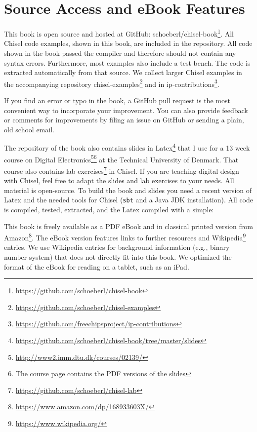 \documentclass[%
    10pt,
    headinclude, footexclude,
    openright, %
    notitlepage,
    cleardoubleempty,
    headsepline,
    pointlessnumbers,
    bibtotoc, idxtotoc,
    ]{scrbook}
\newcommand{\code}[1]{{\lstinline[basicstyle=\small\ttfamily]{#1}}}
\newcommand{\myref}[2]{\href{#1}{#2}}
\renewcommand{\myref}[2]{{#2}{\footnote{\url{#1}}}}
\begin{document}
\section{Source Access and eBook Features}

This book is open source and hosted at GitHub: \myref{https://github.com/schoeberl/chisel-book}{schoeberl/chisel-book}.
All Chisel code examples, shown in this book, are included in the repository.
All code shown in the book passed the compiler and therefore should not contain any syntax errors.
Furthermore, most examples also include a test bench.
The code is extracted automatically from that source.
We collect larger Chisel examples in the accompanying repository
\myref{https://github.com/schoeberl/chisel-examples}{chisel-examples}
and in \myref{https://github.com/freechipsproject/ip-contributions}{ip-contributions}.

If you find an error or typo in the book, a GitHub pull request is the most convenient way to incorporate your improvement.
You can also provide feedback or comments for improvements by filing an issue on GitHub
or sending a plain, old school email.

The repository of the book also contains
\myref{https://github.com/schoeberl/chisel-book/tree/master/slides}{slides in Latex}
that I use for a 13 week course on
\myref{http://www2.imm.dtu.dk/courses/02139/}{Digital Electronics}\footnote{The course page
contains the PDF versions of the slides} at the Technical University of Denmark.
That course also contains \myref{https://github.com/schoeberl/chisel-lab}{lab exercises}
in Chisel.
If you are teaching digital design with Chisel, feel free to adapt the slides and lab
exercises to your needs. All material is open-source. To build the book and slides
you need a recent version of Latex and the needed tools for Chisel (\code{sbt} and
a Java JDK installation). All code is compiled, tested, extracted, and the Latex compiled with
a simple:


This book is freely available as a PDF eBook and in classical printed version from
\myref{https://www.amazon.com/dp/168933603X/}{Amazon}.
The eBook version features links to further resources
and \myref{https://www.wikipedia.org/}{Wikipedia} entries.
We use Wikipedia entries for background information (e.g., binary number system)
that does not directly fit into this book.
We optimized the format of the eBook for reading on a tablet, such as an iPad.
\end{document}
